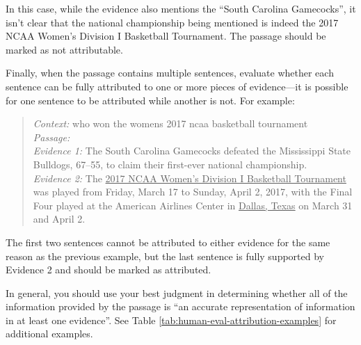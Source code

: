 \documentclass[11pt]{article}
\begin{document}
In this case, while the evidence also mentions the ``South Carolina Gamecocks'', it isn't clear that the national championship being mentioned is indeed the 2017 NCAA Women's Division I Basketball Tournament. The passage should be marked as not attributable.

Finally, when the passage contains multiple sentences, evaluate whether each sentence can be fully attributed to one or more pieces of evidence—it is possible for one sentence to be attributed while another is not. For example:

\begin{quote}
\textit{Context:}
who won the womens 2017 ncaa basketball tournament \\
\textit{Passage:}
   \\
\textit{Evidence 1:}
The South Carolina Gamecocks defeated the Mississippi State Bulldogs, 67–55, to claim their first-ever national championship. \\
\textit{Evidence 2:}
The \ul{2017 NCAA Women's Division I Basketball Tournament} was played from Friday, March 17 to Sunday, April 2, 2017, with the Final Four played at the American Airlines Center in \ul{Dallas, Texas} on March 31 and April 2.
\end{quote}

The first two sentences cannot be attributed to either evidence for the same reason as the previous example, but the last sentence is fully supported by Evidence 2 and should be marked as attributed.

In general, you should use your best judgment in determining whether all of the information provided by the passage is ``an accurate representation of information in at least one evidence''. See Table \ref{tab:human-eval-attribution-examples} for additional examples.
\end{document}
